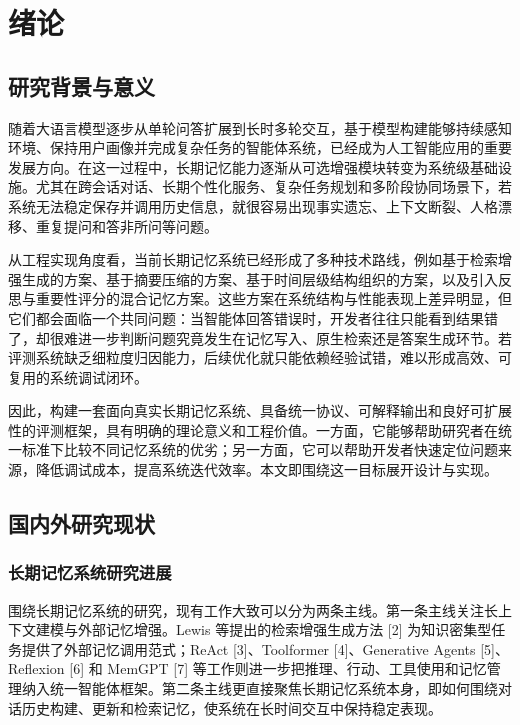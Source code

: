 
\chapter{绪论}

\section{研究背景与意义}

随着大语言模型逐步从单轮问答扩展到长时多轮交互，基于模型构建能够持续感知环境、保持用户画像并完成复杂任务的智能体系统，已经成为人工智能应用的重要发展方向。在这一过程中，长期记忆能力逐渐从可选增强模块转变为系统级基础设施。尤其在跨会话对话、长期个性化服务、复杂任务规划和多阶段协同场景下，若系统无法稳定保存并调用历史信息，就很容易出现事实遗忘、上下文断裂、人格漂移、重复提问和答非所问等问题。

从工程实现角度看，当前长期记忆系统已经形成了多种技术路线，例如基于检索增强生成的方案、基于摘要压缩的方案、基于时间层级结构组织的方案，以及引入反思与重要性评分的混合记忆方案。这些方案在系统结构与性能表现上差异明显，但它们都会面临一个共同问题：当智能体回答错误时，开发者往往只能看到结果错了，却很难进一步判断问题究竟发生在记忆写入、原生检索还是答案生成环节。若评测系统缺乏细粒度归因能力，后续优化就只能依赖经验试错，难以形成高效、可复用的系统调试闭环。

因此，构建一套面向真实长期记忆系统、具备统一协议、可解释输出和良好可扩展性的评测框架，具有明确的理论意义和工程价值。一方面，它能够帮助研究者在统一标准下比较不同记忆系统的优劣；另一方面，它可以帮助开发者快速定位问题来源，降低调试成本，提高系统迭代效率。本文即围绕这一目标展开设计与实现。

\section{国内外研究现状}

\subsection{长期记忆系统研究进展}

围绕长期记忆系统的研究，现有工作大致可以分为两条主线。第一条主线关注长上下文建模与外部记忆增强。Lewis 等提出的检索增强生成方法 [2] 为知识密集型任务提供了外部记忆调用范式；ReAct [3]、Toolformer [4]、Generative Agents [5]、Reflexion [6] 和 MemGPT [7] 等工作则进一步把推理、行动、工具使用和记忆管理纳入统一智能体框架。第二条主线更直接聚焦长期记忆系统本身，即如何围绕对话历史构建、更新和检索记忆，使系统在长时间交互中保持稳定表现。

